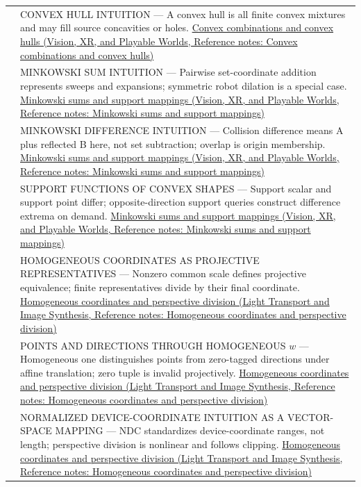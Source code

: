{\begin{longtable}[]{@{}
  >{\raggedright\arraybackslash}p{}
  >{\raggedright\arraybackslash}p{}@{}}
574 & CONVEX HULL INTUITION --- A convex hull is all finite convex mixtures and may fill source concavities or holes. \href{../07-Vision-XR-and-Playable-Worlds/main.pdf\#nameddest=appendix-0026ec42c9d5}{Convex combinations and convex hulls (Vision, XR, and Playable Worlds, Reference notes: Convex combinations and convex hulls)} \\
575 & MINKOWSKI SUM INTUITION --- Pairwise set-coordinate addition represents sweeps and expansions; symmetric robot dilation is a special case. \href{../07-Vision-XR-and-Playable-Worlds/main.pdf\#nameddest=appendix-215ac7099a82}{Minkowski sums and support mappings (Vision, XR, and Playable Worlds, Reference notes: Minkowski sums and support mappings)} \\
576 & MINKOWSKI DIFFERENCE INTUITION --- Collision difference means A plus reflected B here, not set subtraction; overlap is origin membership. \href{../07-Vision-XR-and-Playable-Worlds/main.pdf\#nameddest=appendix-215ac7099a82}{Minkowski sums and support mappings (Vision, XR, and Playable Worlds, Reference notes: Minkowski sums and support mappings)} \\
577 & SUPPORT FUNCTIONS OF CONVEX SHAPES --- Support scalar and support point differ; opposite-direction support queries construct difference extrema on demand. \href{../07-Vision-XR-and-Playable-Worlds/main.pdf\#nameddest=appendix-215ac7099a82}{Minkowski sums and support mappings (Vision, XR, and Playable Worlds, Reference notes: Minkowski sums and support mappings)} \\
578 & HOMOGENEOUS COORDINATES AS PROJECTIVE REPRESENTATIVES --- Nonzero common scale defines projective equivalence; finite representatives divide by their final coordinate. \href{../04-Light-Transport-and-Image-Synthesis/main.pdf\#nameddest=appendix-cb3b26862282}{Homogeneous coordinates and perspective division (Light Transport and Image Synthesis, Reference notes: Homogeneous coordinates and perspective division)} \\
579 & POINTS AND DIRECTIONS THROUGH HOMOGENEOUS \(w\) --- Homogeneous one distinguishes points from zero-tagged directions under affine translation; zero tuple is invalid projectively. \href{../04-Light-Transport-and-Image-Synthesis/main.pdf\#nameddest=appendix-cb3b26862282}{Homogeneous coordinates and perspective division (Light Transport and Image Synthesis, Reference notes: Homogeneous coordinates and perspective division)} \\
580 & NORMALIZED DEVICE-COORDINATE INTUITION AS A VECTOR-SPACE MAPPING --- NDC standardizes device-coordinate ranges, not length; perspective division is nonlinear and follows clipping. \href{../04-Light-Transport-and-Image-Synthesis/main.pdf\#nameddest=appendix-cb3b26862282}{Homogeneous coordinates and perspective division (Light Transport and Image Synthesis, Reference notes: Homogeneous coordinates and perspective division)} \\

\end{longtable}}
